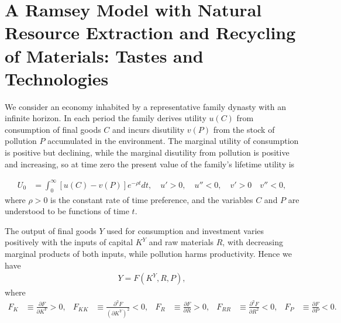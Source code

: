 \section{A Ramsey Model with Natural Resource Extraction and Recycling of Materials: Tastes and Technologies}
\label{sec:model-setup}

We consider an economy inhabited by a representative family dynasty with an infinite horizon. In each period the family derives utility $u(C)$ from consumption of final goods $C$ and incurs disutility $v(P)$ from the stock of pollution $P$ accumulated in the environment. The marginal utility of consumption is positive but declining, while the marginal disutility from pollution is positive and increasing, so at time zero the present value of the family's lifetime utility is

\begin{align}
U_0 &= \int_0^{\infty} \left[u(C) - v(P)\right] e^{-\rho t} dt, \quad  u'>0, \quad u''<0, \quad v'>0 \quad v''<0,
\label{eq:ramsey:utility}
\end{align}
where $\rho > 0$ is the constant rate of time preference, and the variables $C$ and $P$ are understood to be functions of time $t$.

The output of final goods $Y$ used for consumption and investment varies positively with the inputs of capital $K^Y$ and raw materials $R$, with decreasing marginal products of both inputs, while pollution harms productivity. Hence we have
\begin{align}
Y = F(K^Y, R, P),
\label{eq:ramsey:output}
\end{align}
where 
\begin{align*}
F_K &\equiv \frac{\partial F}{\partial K^Y} > 0, &
F_{KK} &\equiv \frac{\partial^2 F}{(\partial K^Y)^2} < 0, & F_R &\equiv \frac{\partial F}{\partial R} > 0,
&
F_{RR} &\equiv \frac{\partial^2 F}{\partial R^2} < 0,
& F_P &\equiv \frac{\partial F}{\partial P} < 0.
\end{align*}

